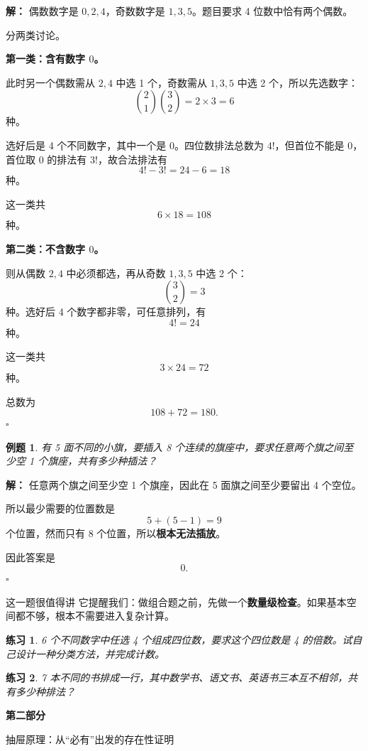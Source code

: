 \documentclass[11pt,a4paper,fontset=fandol]{ctexart}
\theoremstyle{formaltheorem}
\theoremstyle{formalexample}
\newtheorem{example}{例题}[section]
\newtheorem{exercise}{练习}[section]
\newenvironment{solution}{\par\noindent\textbf{解：}}{\hfill$\square$\par}
\newcommand{\partdivider}[2]{%
  \clearpage
  \thispagestyle{empty}
  \vspace*{\fill}
  \begin{center}
  \begin{tcolorbox}[
    enhanced,
    width=0.78\textwidth,
    colback=lightblue,
    colframe=mainblue,
    boxrule=0.9pt,
    arc=0mm,
    left=6mm,
    right=6mm,
    top=8mm,
    bottom=8mm
  ]
  \centering
  {\fontsize{24}{30}\selectfont\bfseries #1\par}
  \vspace{0.6cm}
  {\large #2\par}
  \end{tcolorbox}
  \end{center}
  \vspace*{\fill}
  \clearpage
}
\begin{document}
\begin{solution}
偶数数字是 $0,2,4$，奇数数字是 $1,3,5$。题目要求 4 位数中恰有两个偶数。

分两类讨论。

\textbf{第一类：含有数字 $0$。}

此时另一个偶数需从 $2,4$ 中选 1 个，奇数需从 $1,3,5$ 中选 2 个，所以先选数字：
\[
\binom{2}{1}\binom{3}{2}=2\times 3=6
\]
种。

选好后是 4 个不同数字，其中一个是 $0$。四位数排法总数为 $4!$，但首位不能是 $0$，首位取 $0$ 的排法有 $3!$，故合法排法有
\[
4!-3!=24-6=18
\]
种。

这一类共
\[
6\times 18=108
\]
种。

\textbf{第二类：不含数字 $0$。}

则从偶数 $2,4$ 中必须都选，再从奇数 $1,3,5$ 中选 2 个：
\[
\binom{3}{2}=3
\]
种。选好后 4 个数字都非零，可任意排列，有
\[
4!=24
\]
种。

这一类共
\[
3\times 24=72
\]
种。

总数为
\[
108+72=180.
\]
\end{solution}

\begin{example}
有 5 面不同的小旗，要插入 8 个连续的旗座中，要求任意两个旗之间至少空 1 个旗座，共有多少种插法？
\end{example}

\begin{solution}
任意两个旗之间至少空 1 个旗座，因此在 5 面旗之间至少要留出 4 个空位。

所以最少需要的位置数是
\[
5+(5-1)=9
\]
个位置，然而只有 8 个位置，所以\textbf{根本无法插放}。

因此答案是
\[
0.
\]
\end{solution}

\begin{notebox}{这一题很值得讲}
它提醒我们：做组合题之前，先做一个\textbf{数量级检查}。如果基本空间都不够，根本不需要进入复杂计算。
\end{notebox}

\begin{exercise}
6 个不同数字中任选 4 个组成四位数，要求这个四位数是 4 的倍数。试自己设计一种分类方法，并完成计数。
\end{exercise}

\begin{exercise}
7 本不同的书排成一行，其中数学书、语文书、英语书三本互不相邻，共有多少种排法？
\end{exercise}

\partdivider{第二部分}{抽屉原理：从“必有”出发的存在性证明}
\end{document}
